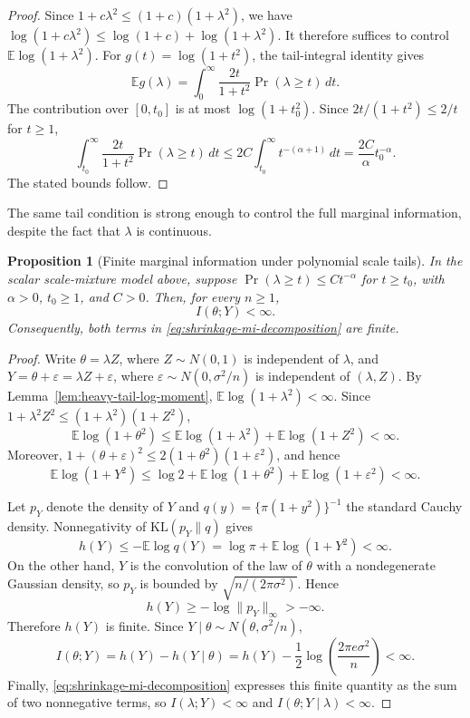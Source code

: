 \documentclass[11pt]{article}
\theoremstyle{plain}
\newtheorem{proposition}{Proposition}
\theoremstyle{definition}
\theoremstyle{remark}
\newcommand{\E}{\mathbb{E}}
\newcommand{\KL}{\mathrm{KL}}
\begin{document}
\begin{proof}
	Since \(1+c\lambda^2\leq(1+c)(1+\lambda^2)\), we have \(\log(1+c\lambda^2)\leq\log(1+c)+\log(1+\lambda^2)\). It therefore suffices to control \(\E\log(1+\lambda^2)\). For \(g(t)=\log(1+t^2)\), the tail-integral identity gives
	\[
	\E g(\lambda)
	=
	\int_0^\infty
	\frac{2t}{1+t^2}\Pr(\lambda\geq t)\,dt.
	\]
	The contribution over \([0,t_0]\) is at most \(\log(1+t_0^2)\). Since \(2t/(1+t^2)\leq2/t\) for \(t\geq1\),
	\[
	\int_{t_0}^\infty
	\frac{2t}{1+t^2}\Pr(\lambda\geq t)\,dt
	\leq
	2C\int_{t_0}^\infty t^{-(\alpha+1)}\,dt
	=
	\frac{2C}{\alpha}t_0^{-\alpha}.
	\]
	The stated bounds follow.
\end{proof}

The same tail condition is strong enough to control the full marginal information, despite the fact that \(\lambda\) is continuous.

\begin{proposition}[Finite marginal information under polynomial scale tails]
	\label{prop:scale-mi-finite}
	In the scalar scale-mixture model above, suppose \(\Pr(\lambda\geq t)\leq Ct^{-\alpha}\) for \(t\geq t_0\), with \(\alpha>0\), \(t_0\geq1\), and \(C>0\). Then, for every \(n\geq1\),
	\[
	I(\theta;Y)<\infty.
	\]
	Consequently, both terms in \eqref{eq:shrinkage-mi-decomposition} are finite.
\end{proposition}

\begin{proof}
	Write \(\theta=\lambda Z\), where \(Z\sim N(0,1)\) is independent of \(\lambda\), and \(Y=\theta+\varepsilon=\lambda Z+\varepsilon\), where \(\varepsilon\sim N(0,\sigma^2/n)\) is independent of \((\lambda,Z)\). By Lemma~\ref{lem:heavy-tail-log-moment}, \(\E\log(1+\lambda^2)<\infty\). Since \(1+\lambda^2Z^2\leq(1+\lambda^2)(1+Z^2)\),
	\[
	\E\log(1+\theta^2)
	\leq
	\E\log(1+\lambda^2)+\E\log(1+Z^2)
	<
	\infty.
	\]
	Moreover, \(1+(\theta+\varepsilon)^2\leq2(1+\theta^2)(1+\varepsilon^2)\), and hence
	\[
	\E\log(1+Y^2)
	\leq
	\log2+\E\log(1+\theta^2)+\E\log(1+\varepsilon^2)
	<
	\infty.
	\]
	
	Let \(p_Y\) denote the density of \(Y\) and \(q(y)=\{\pi(1+y^2)\}^{-1}\) the standard Cauchy density. Nonnegativity of \(\KL(p_Y\|q)\) gives
	\[
	h(Y)
	\leq
	-\E\log q(Y)
	=
	\log\pi+\E\log(1+Y^2)
	<
	\infty.
	\]
	On the other hand, \(Y\) is the convolution of the law of \(\theta\) with a nondegenerate Gaussian density, so \(p_Y\) is bounded by \(\sqrt{n/(2\pi\sigma^2)}\). Hence
	\[
	h(Y)\geq-\log\|p_Y\|_\infty>-\infty.
	\]
	Therefore \(h(Y)\) is finite. Since \(Y\mid\theta\sim N(\theta,\sigma^2/n)\),
	\[
	I(\theta;Y)
	=
	h(Y)-h(Y\mid\theta)
	=
	h(Y)-\frac12\log\left(\frac{2\pi e\sigma^2}{n}\right)
	<
	\infty.
	\]
	Finally, \eqref{eq:shrinkage-mi-decomposition} expresses this finite quantity as the sum of two nonnegative terms, so \(I(\lambda;Y)<\infty\) and \(I(\theta;Y\mid\lambda)<\infty\).
\end{proof}
\end{document}
